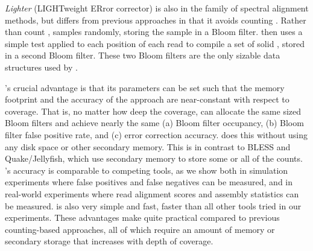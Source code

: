 \documentclass[10pt]{article}
\begin{document}
\emph{Lighter} (LIGHTweight ERror corrector) is also in the family of spectral alignment methods, but differs from previous approaches in that it avoids counting \kmers.
Rather than count \kmers, \tool samples \kmers randomly, storing the sample in a Bloom filter.
\tool then uses a simple test applied to each position of each read to compile a set of solid \kmers, stored in a second Bloom filter.
These two Bloom filters are the only sizable data structures used by \tool.

\tool's crucial advantage is that its parameters can be set such that the memory footprint and the accuracy of the approach are near-constant with respect to coverage.
That is, no matter how deep the coverage, \tool can allocate the same sized Bloom filters and achieve nearly the same (a) Bloom filter occupancy, (b) Bloom filter false positive rate, and (c) error correction accuracy.
\tool does this without using any disk space or other secondary memory.
This is in contrast to BLESS and Quake/Jellyfish, which use secondary memory to store some or all of the \kmer counts.
\tool's accuracy is comparable to competing tools, as we show both in simulation experiments where false positives and false negatives can be measured, and in real-world experiments where read alignment scores and assembly statistics can be measured.  
\tool is also very simple and fast, faster than all other tools tried in our experiments.
These advantages make \tool quite practical compared to previous counting-based approaches, all of which require an amount of memory or secondary storage that increases with depth of coverage.




\end{document}
